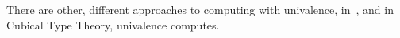 There are other, different approaches to computing with univalence,
in~\cite*{angiuliInternalizingRepresentationIndependence2021,tabareauMarriageUnivalenceParametricity2021}, and in
Cubical Type
Theory\cite*{cohenCubicalTypeTheory2018,angiuliComputationalSemanticsCartesianCubical2019,vezzosiCubicalAgdaDependently2019},
univalence computes.












